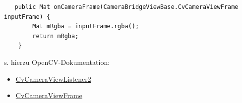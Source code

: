 \begin{description}
\begin{lstlisting}
   public Mat onCameraFrame(CameraBridgeViewBase.CvCameraViewFrame inputFrame) {
        Mat mRgba = inputFrame.rgba();
        return mRgba;
    }
\end{lstlisting}

s. hierzu OpenCV-Dokumentation:
\begin{itemize}
\item \href{http://docs.opencv.org/java/2.4.9/org/opencv/android/CameraBridgeViewBase.CvCameraViewListener2.html}{CvCameraViewListener2}
\item \href{http://docs.opencv.org/java/2.4.9/org/opencv/android/CameraBridgeViewBase.CvCameraViewFrame.html}{CvCameraViewFrame}
\end{itemize}

\end{description}







